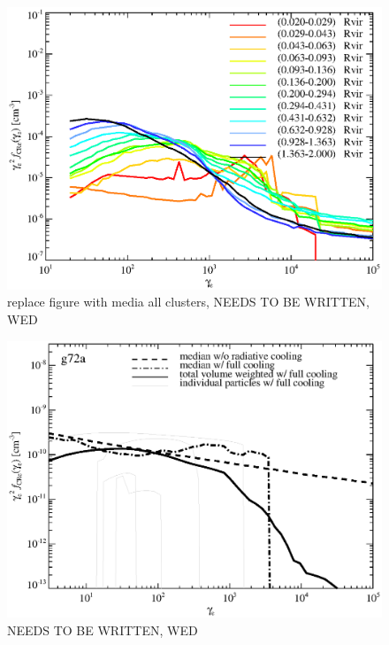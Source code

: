 \documentclass[useAMS,usenatbib]{mn2e}
\def\del#1{{}}
\newcommand{\e}{\mathrm{e}}
\newcommand{\rvir}{R_{200}}
\newcommand{\gam}{\gamma}
\begin{document}
\begin{figure}
  \includegraphics[width=1.0\columnwidth]{./figures/old/CRespecRadial.Radial2Rv.a24.140.v16.eps}
  \caption{replace figure with media all clusters, NEEDS TO BE WRITTEN, WED}
\end{figure}

\begin{figure}
  \includegraphics[width=1.0\columnwidth]{./figures/CRespec.g72a.1.4Rv.a24.full.140.v20.eps}
  \caption{NEEDS TO BE WRITTEN, WED\del{Cosmic ray electron spectra in
      cluster outskirts at redshift zero. We show the CR electron
      distribution function weighted with the electron Lorentz factor
      ($\gam_\e$) squared for a cluster with a recent merger for
      region between (1.3-1.5)$\rvir$. The solid lines show the median
      CR electron spectrum where both radiative and adiabatic losses
      are included. The dotted lines shows the 68 percentiles. The
      dashed lines show the CR electron spectrum without Coulomb and
      radiative cooling. Note that the Coulomb cooling at low energies
      is very inefficient because of the low electron densities in the
      cluster outskirts.}\label{fig:e_spec}}
\end{figure}
\end{document}
